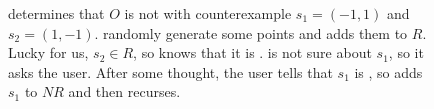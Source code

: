 \begin{figure*}[ht]
\begin{subfigure}[t]{0.58\textwidth}
    \caption{%
      \Helper{} determines that $O$ is not  with
      counterexample $s_1 = (-1, 1)$ and $s_2 = (1, -1)$. \Helper{} randomly
      generate some \sTIreachable{} points and adds them to $R$. Lucky for
      us, $s_2 \in R$, so \Helper{} knows that it is \sTIreachable{}.
      \Helper{} is not sure about $s_1$, so it asks the user. After some
      thought, the user tells \Helper{} that $s_1$ is \sTIunreachable{}, so
      \Helper{} adds $s_1$ to $NR$ and then recurses.
    }
  \end{subfigure}


\end{figure*}
